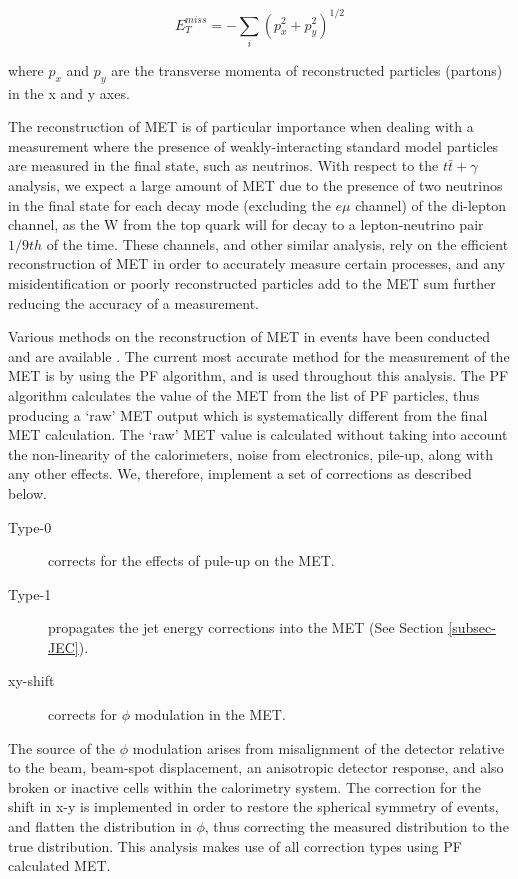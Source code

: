 \begin{equation}
E^{miss}_T = - \sum_i(p^2_x + p^2_y)^{1/2}
\end{equation}

where $p_x$ and $p_y$ are the transverse momenta of reconstructed particles (partons) in the x and y axes.

The reconstruction of MET is of particular importance when dealing with a measurement where the presence of weakly-interacting standard model particles are measured in the final state, such as neutrinos.  With respect to the $t\bar{t}+\gamma$ analysis, we expect a large amount of MET due to the presence of two neutrinos in the final state for each decay mode (excluding the $e\mu$ channel) of the di-lepton channel, as the W from the top quark will for decay to a lepton-neutrino pair $1/9th$ of the time. These channels, and other similar analysis, rely on the efficient reconstruction of MET in order to accurately measure certain processes, and any misidentification or poorly reconstructed particles add to the MET sum further reducing the accuracy of a measurement.  

Various methods on the reconstruction of MET in events have been conducted and are available \cite{1748-0221-6-09-P09001}. The current most accurate method for the measurement of the MET is by using the PF algorithm, and is used throughout this analysis. The PF algorithm calculates the value of the MET from the list of PF particles, thus producing a `raw' MET output which is systematically different from the final MET calculation. The `raw' MET value is calculated without taking into account the non-linearity of the calorimeters, noise from electronics, pile-up, along with any other effects. We, therefore, implement a set of corrections as described below.

\begin{description}
	\item[Type-0] corrects for the effects of pule-up on the MET.
	\item[Type-1] propagates the jet energy corrections into the MET (See Section \ref{subsec-JEC}). 
	\item[xy-shift] corrects for $\phi$ modulation in the MET.
\end{description}

The source of the $\phi$ modulation arises from misalignment of the detector relative to the beam, beam-spot displacement, an anisotropic detector response, and also broken or inactive cells within the calorimetry system. The correction for the shift in x-y is implemented in order to restore the spherical symmetry of events, and flatten the distribution in $\phi$, thus correcting the measured distribution to the true distribution. This analysis makes use of all correction types using PF calculated MET. 